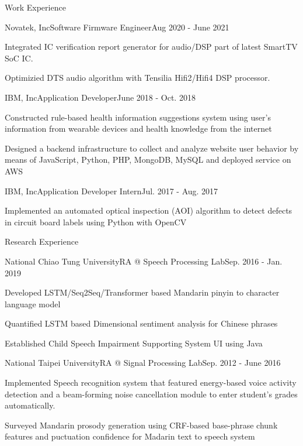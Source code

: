 \documentclass{resume_short} %
\begin{document}
\begin{rSection}{Work Experience}
    \begin{rSubsection3}{Novatek, Inc}{Software Firmware Engineer}{Aug 2020 - June 2021}
        \item Integrated IC verification report generator for audio/DSP part of latest SmartTV SoC IC.
        \item Optimizied DTS audio algorithm with Tensilia Hifi2/Hifi4 DSP processor.
    \end{rSubsection3}

    \begin{rSubsection3}{IBM, Inc}{Application Developer}{June 2018 - Oct. 2018}
        \item Constructed rule-based health information suggestions system using user's information from wearable devices and health knowledge from the internet
        \item Designed a backend infrastructure to collect and analyze website user behavior by means of JavaScript, Python, PHP, MongoDB, MySQL and deployed service on AWS
    \end{rSubsection3}
    \begin{rSubsection3}{IBM, Inc}{Application Developer Intern}{Jul. 2017 - Aug. 2017}
        \item Implemented an automated optical inspection (AOI) algorithm to 
              detect defects in circuit board labels using Python with OpenCV
    \end{rSubsection3}
\end{rSection}

\begin{rSection}{Research Experience}
    \begin{rSubsection3}{National Chiao Tung University}{RA @ Speech Processing Lab}{Sep. 2016 - Jan. 2019}
        \item Developed LSTM/Seq2Seq/Transformer based Mandarin pinyin to character language model  
        \item Quantified LSTM based Dimensional sentiment analysis for Chinese phrases
        \item Established Child Speech Impairment Supporting System UI using Java
    \end{rSubsection3}
    \begin{rSubsection3}{National Taipei University}{RA @ Signal Processing Lab}{Sep. 2012 - June 2016}
        \item Implemented Speech recognition system that featured energy-based voice activity detection and a beam-forming noise cancellation module to enter student’s grades automatically.
        \item Surveyed Mandarin prosody generation using CRF-based base-phrase chunk features and puctuation confidence for Madarin text to speech system
    \end{rSubsection3}
\end{rSection}
\end{document}
